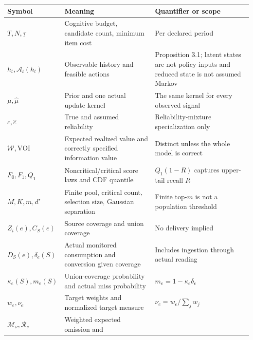 \documentclass[
  11pt]{article}
\begin{document}
\begin{longtable}[]{@{}
  >{\raggedright\arraybackslash}p{}
  >{\raggedright\arraybackslash}p{}
  >{\raggedright\arraybackslash}p{}@{}}
\toprule\noalign{}
\begin{minipage}[b]{\linewidth}\raggedright
Symbol
\end{minipage} & \begin{minipage}[b]{\linewidth}\raggedright
Meaning
\end{minipage} & \begin{minipage}[b]{\linewidth}\raggedright
Quantifier or scope
\end{minipage} \\
\midrule\noalign{}
\endhead
\bottomrule\noalign{}
\endlastfoot
\(T,N,\underline\tau\) & Cognitive budget, candidate count, minimum item
cost & Per declared period \\
\(h_t,\mathcal A_t(h_t)\) & Observable history and feasible actions &
Proposition 3.1; latent states are not policy inputs and reduced state
is not assumed Markov \\
\(\mu,\widehat\mu\) & Prior and one actual update kernel & The same
kernel for every observed signal \\
\(c,\hat c\) & True and assumed reliability & Reliability-mixture
specialization only \\
\(\mathcal W,\mathrm{VOI}\) & Expected realized value and correctly
specified information value & Distinct unless the whole model is
correct \\
\(F_0,F_1,Q_1\) & Noncritical/critical score laws and CDF quantile &
\(Q_1(1-R)\) captures upper-tail recall \(R\) \\
\(M,K,m,d'\) & Finite pool, critical count, selection size, Gaussian
separation & Finite top-\(m\) is not a population threshold \\
\(Z_i(e),C_S(e)\) & Source coverage and union coverage & No delivery
implied \\
\(D_S(e),\delta_e(S)\) & Actual monitored consumption and conversion
given coverage & Includes ingestion through actual reading \\
\(\kappa_e(S),m_e(S)\) & Union-coverage probability and actual miss
probability & \(m_e=1-\kappa_e\delta_e\) \\
\(w_e,\nu_e\) & Target weights and normalized target measure &
\(\nu_e=w_e/\sum_jw_j\) \\
\(\mathcal M_\nu,\mathcal R_\nu\) & Weighted expected omission and

\end{longtable}
\end{document}

